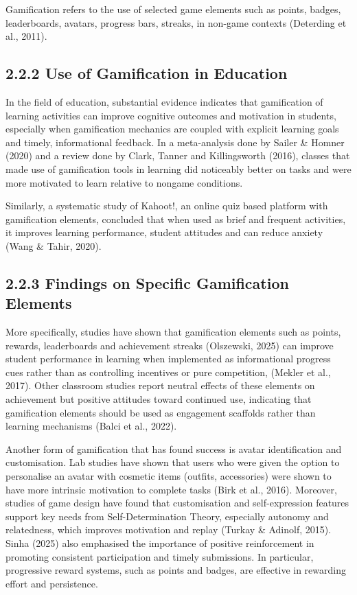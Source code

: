 \documentclass[
  12pt,
  a4paper,
]{report}
\begin{document}
Gamification refers to the use of selected game elements such as points,
badges, leaderboards, avatars, progress bars, streaks, in non-game
contexts (Deterding et al., 2011).

\hypertarget{use-of-gamification-in-education}{%
\subsection{2.2.2 Use of Gamification in
Education}\label{use-of-gamification-in-education}}

In the field of education, substantial evidence indicates that
gamification of learning activities can improve cognitive outcomes and
motivation in students, especially when gamification mechanics are
coupled with explicit learning goals and timely, informational feedback.
In a meta-analysis done by Sailer \& Homner (2020) and a review done by
Clark, Tanner and Killingsworth (2016), classes that made use of
gamification tools in learning did noticeably better on tasks and were
more motivated to learn relative to nongame conditions.

Similarly, a systematic study of Kahoot!, an online quiz based platform
with gamification elements, concluded that when used as brief and
frequent activities, it improves learning performance, student attitudes
and can reduce anxiety (Wang \& Tahir, 2020).

\hypertarget{findings-on-specific-gamification-elements}{%
\subsection{2.2.3 Findings on Specific Gamification
Elements}\label{findings-on-specific-gamification-elements}}

More specifically, studies have shown that gamification elements such as
points, rewards, leaderboards and achievement streaks (Olszewski, 2025) can improve
student performance in learning when implemented as informational
progress cues rather than as controlling incentives or pure competition,
(Mekler et al., 2017). Other classroom studies report neutral effects of
these elements on achievement but positive attitudes toward continued
use, indicating that gamification elements should be used as engagement
scaffolds rather than learning mechanisms (Balci et al., 2022).

Another form of gamification that has found success is avatar
identification and customisation. Lab studies have shown that users who
were given the option to personalise an avatar with cosmetic items
(outfits, accessories) were shown to have more intrinsic motivation to
complete tasks (Birk et al., 2016). Moreover, studies of game design
have found that customisation and self-expression features support key
needs from Self-Determination Theory, especially autonomy and
relatedness, which improves motivation and replay (Turkay \& Adinolf,
2015). Sinha (2025) also emphasised the importance of positive reinforcement
in promoting consistent participation and timely submissions. In particular,
progressive reward systems, such as points and badges, are effective in
rewarding effort and persistence.
\end{document}
